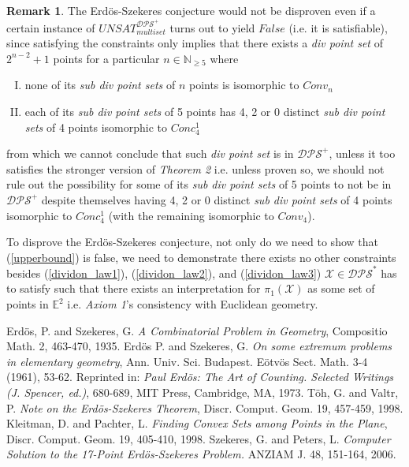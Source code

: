 \documentclass[11pt, oneside]{article}      %
\theoremstyle{definition}
\numberwithin{equation}{section}
\newtheorem*{remark}{Remark}
\newcommand{\reff}[1]{(\ref{#1})}
\theoremstyle{c}
\begin{document}
\begin{remark}
The Erd{\"o}s-Szekeres conjecture would not be disproven even if a certain instance of $UNSAT_{multiset}^{\mathscr{DPS}^+}$ turns out to yield $False$ (i.e. it is satisfiable), since satisfying the constraints only implies that there exists a \textit{div point set} of $2^{n-2}+1$ points for a particular $n \in \mathbb{N}_{\geq 5}$ where
\begin{enumerate}[I.]
\item none of its \textit{sub div point sets} of $n$ points is isomorphic to $Conv_n$
\item each of its \textit{sub div point sets} of 5 points has 4, 2 or 0 distinct \textit{sub div point sets} of 4 points isomorphic to $Conc_4^1$
\end{enumerate}
from which we cannot conclude that such \textit{div point set} is in $\mathscr{DPS}^+$, unless it too satisfies the stronger version of \textit{Theorem 2} i.e. unless proven so, we should not rule out the possibility for some of its \textit{sub div point sets} of 5 points to not be in $\mathscr{DPS}^+$ despite themselves having 4, 2 or 0 distinct \textit{sub div point sets} of 4 points isomorphic to $Conc_4^1$ (with the remaining isomorphic to $Conv_4$).

To disprove the Erd{\"o}s-Szekeres conjecture, not only do we need to show that \reff{upperbound} is false, we need to demonstrate there exists no other constraints besides \reff{dividon_law1}, \reff{dividon_law2}, and \reff{dividon_law3} $\mathscr{X} \in \mathscr{DPS}^*$ has to satisfy such that there exists an interpretation for $\pi_1(\mathscr{X})$ as some set of points in $\mathbb{E}^2$ i.e. \textit{Axiom 1}'s consistency with Euclidean geometry.
\end{remark}

\begin{thebibliography}{9}
   Erd{\"o}s, P. and Szekeres, G.
  \emph{A Combinatorial Problem in Geometry},
  Compositio Math. 2, 463-470, 1935.
 Erd{\"o}s P. and Szekeres, G.
 \emph{On some extremum problems in elementary geometry}, Ann. Univ.
Sci. Budapest. E{\"o}tv{\"o}s Sect. Math. 3-4 (1961), 53-62. Reprinted in: \emph{Paul Erd{\"o}s: The Art
of Counting. Selected Writings (J. Spencer, ed.)}, 680-689, MIT Press, Cambridge, MA,
1973.
T{\"o}h, G. and Valtr, P.
\emph{Note on the Erd{\"o}s-Szekeres Theorem},
Discr. Comput. Geom. 19, 457-459, 1998.
Kleitman, D. and Pachter, L.
\emph{Finding Convex Sets among Points in the Plane},
Discr. Comput. Geom. 19, 405-410, 1998.
Szekeres, G. and Peters, L.
\emph{Computer Solution to the 17-Point Erd{\"o}s-Szekeres Problem.}
ANZIAM J. 48, 151-164, 2006.
\end{thebibliography}
\end{document}
